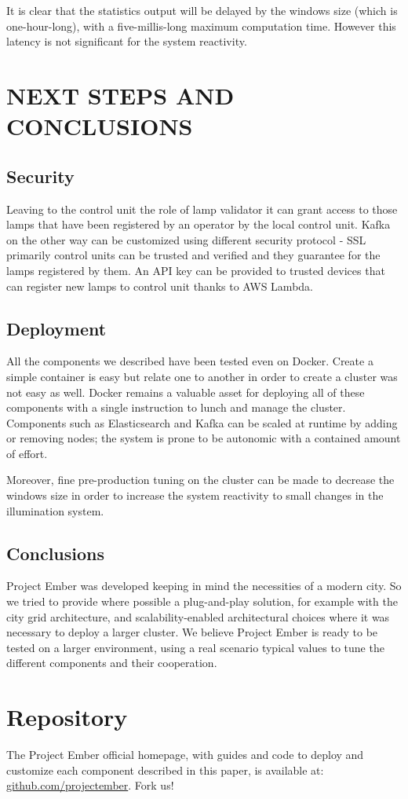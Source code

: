 It is clear that the statistics output will be delayed by the windows size (which is one-hour-long), with a five-millis-long maximum computation time. However this latency is not significant for the system reactivity.

\section{NEXT STEPS AND CONCLUSIONS}

\subsection{Security}
Leaving to the control unit the role of lamp validator it can grant access to those lamps that have been registered by an operator by the local control unit. Kafka on the other way can be customized using different security protocol - SSL primarily control units can be trusted and verified and they guarantee for the lamps registered by them. An API key can be provided to trusted devices that can register new lamps to control unit thanks to AWS Lambda. 

\subsection{Deployment}
All the components we described have been tested even on Docker. Create a simple container is easy but relate one to another in order to create a cluster was not easy as well. Docker remains a valuable asset for deploying all of these components with a single instruction to lunch and manage the cluster. Components such as Elasticsearch and Kafka can be scaled at runtime by adding or removing nodes; the system is prone to be autonomic with a contained amount of effort.

Moreover, fine pre-production tuning on the cluster can be made to decrease the windows size in order to increase the system reactivity to small changes in the illumination system.

\subsection{Conclusions}
Project Ember was developed keeping in mind the necessities of a modern city. So we tried to provide where possible a plug-and-play solution, for example with the city grid architecture, and scalability-enabled architectural choices where it was necessary to deploy a larger cluster. We believe Project Ember is ready to be tested on a larger environment, using a real scenario typical values to tune the different components and their cooperation. 

\section*{Repository}
The Project Ember official homepage, with guides and code to deploy and customize each component described in this paper, is available at: \href{https://github.com/projectember}{github.com/projectember}. Fork us!

